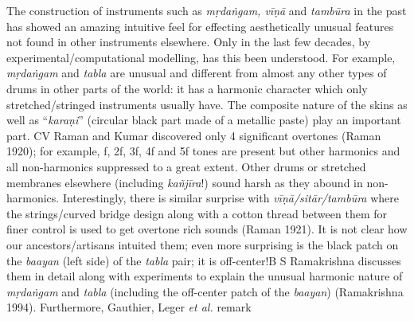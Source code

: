 The construction of instruments such as \textsl{mṛdaṅgam, vīṇā} and \textsl{tambūra} in the past has showed an amazing intuitive feel for effecting aesthetically unusual features not found in other instruments elsewhere. Only in the last few decades, by experimental/computational modelling, has this been understood. For example, \textsl{mṛdaṅgam} and \textsl{tabla} are unusual and different from almost any other types of drums in other parts of the world: it has a harmonic character which only stretched/\-stringed instruments usually have. The composite nature of the skins as well as “\textsl{karaṇi}” (circular black part made of a metallic paste) play an important part.  CV Raman and Kumar discovered only 4 significant overtones (Raman 1920); for example, f, 2f, 3f, 4f and 5f tones are present but other harmonics and all non-harmonics suppressed to a great extent. Other drums or stretched membranes elsewhere (including \textsl{kañjīra}!) sound harsh as they abound in non-harmonics. Interestingly, there is similar surprise with \textsl{vīṇā/sitār/tambūra} where the strings/curved bridge design along with a cotton thread between them for finer control is used to get overtone rich sounds (Raman 1921). It is not clear how our ancestors/artisans intuited them; even more surprising is the black patch on the \textsl{baayan} (left side) of the \textsl{tabla} pair; it is off-center!\break B S Ramakrishna discusses them in detail along with experiments to explain the unusual harmonic nature of \textsl{mṛdaṅgam} and \textsl{tabla} (including the off-center patch of the \textsl{baayan}) (Ramakrishna 1994). Furthermore, Gauthier, Leger \textsl{et al.} remark 

